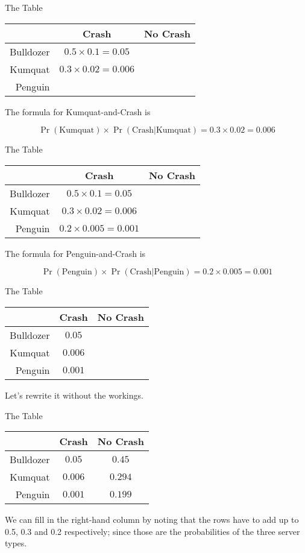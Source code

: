\documentclass[
  ignorenonframetext,
]{beamer}
\renewcommand{\,}{\text{, }}
\begin{document}
\begin{frame}{The Table}
\protect\hypertarget{the-table-1}{}

\begin{longtable}[]{@{}rcc@{}}
\toprule
& Crash & No Crash\tabularnewline
\midrule
\endhead
Bulldozer & \(0.5 \times 0.1 = 0.05\) &\tabularnewline
Kumquat & \(0.3 \times 0.02 = 0.006\) &\tabularnewline
Penguin & &\tabularnewline
\bottomrule
\end{longtable}

The formula for Kumquat-and-Crash is

\[
\Pr(\text{Kumquat}) \times \Pr(\text{Crash}|\text{Kumquat}) = 0.3 \times 0.02 = 0.006
\]

\end{frame}

\begin{frame}{The Table}
\protect\hypertarget{the-table-2}{}

\begin{longtable}[]{@{}rcc@{}}
\toprule
& Crash & No Crash\tabularnewline
\midrule
\endhead
Bulldozer & \(0.5 \times 0.1 = 0.05\) &\tabularnewline
Kumquat & \(0.3 \times 0.02 = 0.006\) &\tabularnewline
Penguin & \(0.2 \times 0.005 = 0.001\) &\tabularnewline
\bottomrule
\end{longtable}

The formula for Penguin-and-Crash is

\[
\Pr(\text{Penguin}) \times \Pr(\text{Crash}|\text{Penguin}) = 0.2 \times 0.005 = 0.001
\]

\end{frame}

\begin{frame}{The Table}
\protect\hypertarget{the-table-3}{}

\begin{longtable}[]{@{}rcc@{}}
\toprule
& Crash & No Crash\tabularnewline
\midrule
\endhead
Bulldozer & \(0.05\) &\tabularnewline
Kumquat & \(0.006\) &\tabularnewline
Penguin & \(0.001\) &\tabularnewline
\bottomrule
\end{longtable}

Let's rewrite it without the workings.

\end{frame}

\begin{frame}{The Table}
\protect\hypertarget{the-table-4}{}

\begin{longtable}[]{@{}rcc@{}}
\toprule
& Crash & No Crash\tabularnewline
\midrule
\endhead
Bulldozer & \(0.05\) & \(0.45\)\tabularnewline
Kumquat & \(0.006\) & \(0.294\)\tabularnewline
Penguin & \(0.001\) & \(0.199\)\tabularnewline
\bottomrule
\end{longtable}

We can fill in the right-hand column by noting that the rows have to add
up to 0.5, 0.3 and 0.2 respectively; since those are the probabilities
of the three server types.

\end{frame}
\end{document}
